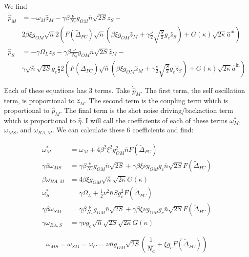 \documentclass[12pt]{article}
\begin{document}
We find
\begin{align}
\dot{\hat{p}}_M  &= -\omega_M \hat{z}_M - \gamma \beta \frac{\nu}{N_a} g_{OM} \bar{n} \sqrt{2S} \hat{z}_S - \\
 &2 \beta \xi g_{OM} \sqrt{\bar{n}} 2\left( F(\tilde{\Delta}_{PC}) \sqrt{\bar{n}} \left( \beta \xi g_{OM} \hat{z}_M + \gamma \frac{\nu}{2} \sqrt{\frac{S}{2}} g_c \hat{z}_S \right) + G(\kappa) \sqrt{2 \kappa} \hat{a}^{\text{in}}    \right) \\
 \dot{\hat{p}}_S & = -\gamma \Omega_L \hat{z}_S - \gamma \beta \frac{\nu}{N_a} g_{OM} \bar{n} \sqrt{2S} \hat{z}_M - \\
& \gamma \sqrt{\bar{n}} \sqrt{2S} g_c \frac{\nu}{2} 2 \left(  F(\tilde{\Delta}_{PC}) \sqrt{\bar{n}} \left( \beta \xi g_{OM} \hat{z}_M + \gamma \frac{\nu}{2} \sqrt{\frac{S}{2}} g_c \hat{z}_S \right) + G(\kappa) \sqrt{2 \kappa} \hat{a}^{\text{in}} \right)
\end{align}

Each of these equations has 3 terms. Take $\dot{\hat{p}}_M$. The first term, the self oscillation term, is proportional to $\hat{z}_M$. The second term is the coupling term which is proportional to $\hat{p}_M$. The final term is the shot noise driving/backaction term which is proportional to $\hat{\eta}$. I will call the coefficients of each of these terms $\omega_M^*$, $\omega_{MS}$, and $\omega_{BA,M}$.
We can calculate these 6 coefficients and find:

\begin{align}
\omega_M^* & = \omega_M + 4 \beta^2 \xi^2 g_{OM}^2 \bar{n} F(\tilde{\Delta}_{PC}) \\
\gamma \beta\omega_{MS} & = \gamma \beta \frac{\nu}{N_a} g_{OM} \bar{n} \sqrt{2S} + \gamma \beta \xi \nu g_{OM} g_c \bar{n} \sqrt{2S} F(\tilde{\Delta}_{PC}) \\
\beta \omega_{BA,M} & = 4 \beta \xi g_{OM} \sqrt{\bar{n}} \sqrt{2 \kappa} G(\kappa) \\
\omega_S^* & = \gamma \Omega_L + \frac{1}{2} \nu^2 \bar{n} S g_c^2 F(\tilde{\Delta}_{PC}) \\
\gamma \beta \omega_{SM} & = \gamma \beta \frac{\nu}{N_a} g_{OM} \bar{n} \sqrt{2S} + \gamma \beta \xi \nu g_{OM} g_c \bar{n} \sqrt{2S} F(\tilde{\Delta}_{PC}) \\
\gamma \omega_{BA,S} & = \gamma \nu g_c \sqrt{\bar{n}}  \sqrt{2S} \sqrt{2 \kappa} G(\kappa)
\end{align}

\[
\omega_{MS} = \omega_{SM} = \omega_C = \nu \bar{n} g_{OM} \sqrt{2S} \left(\frac{1}{N_a} + \xi g_c F(\tilde{\Delta}_{PC})\right)
\]
\end{document}
